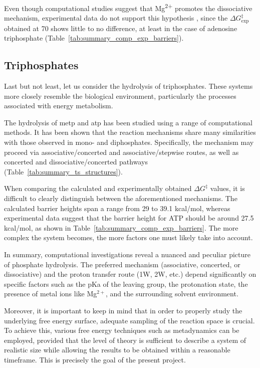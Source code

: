 Even though computational studies suggest that Mg\textsuperscript{2+} promotes the dissociative mechanism, experimental data do not support this hypothesis \citep{ramirezMagnesiumCalciumIon1980}, since the $\Delta G^{\ddagger}_{\text{exp}}$ obtained at 70 shows little to no difference, at least in the case of adenosine triphosphate (Table~\ref{tab:summary_comp_exp_barriers}).



\subsection{Triphosphates}
Last but not least, let us consider the hydrolysis of triphosphates. These systems more closely resemble the biological environment, particularly the processes associated with energy metabolism.

The hydrolysis of \ac{metp} and \ac{atp} has been studied using a range of computational methods. It has been shown that the reaction mechanisms share many similarities with those observed in mono- and diphosphates. Specifically, the mechanism may proceed via associative/concerted and associative/stepwise routes, as well as concerted and dissociative/concerted pathways (Table~\ref{tab:summary_ts_structures}). 

When comparing the calculated and experimentally obtained $\Delta G^{\ddagger}$ values, it is difficult to clearly distinguish between the aforementioned mechanisms. The calculated barrier heights span a range from 29 to 39.1 kcal/mol, whereas experimental data suggest that the barrier height for ATP should be around 27.5 kcal/mol, as shown in Table~\ref{tab:summary_comp_exp_barriers}. The more complex the system becomes, the more factors one must likely take into account.

In summary, computational investigations reveal a nuanced and peculiar picture of phosphate hydrolysis. The preferred mechanism (associative, concerted, or dissociative) and the proton transfer route (1W, 2W, etc.) depend significantly on specific factors such as the pKa of the leaving group, the protonation state, the presence of metal ions like Mg$^{2+}$, and the surrounding solvent environment. 

Moreover, it is important to keep in mind that in order to properly study the underlying free energy surface, adequate sampling of the reaction space is crucial. To achieve this, various free energy techniques such as metadynamics can be employed, provided that the level of theory is sufficient to describe a system of realistic size while allowing the results to be obtained within a reasonable timeframe. This is precisely the goal of the present project.



